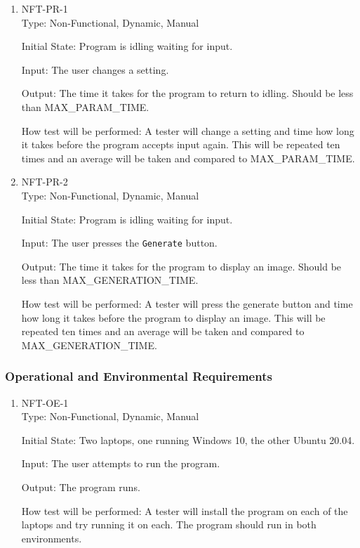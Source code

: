 \documentclass[12pt, titlepage]{article}
\begin{document}
\begin{enumerate}

\item{NFT-PR-1}\\
Type: Non-Functional, Dynamic, Manual

Initial State: Program is idling waiting for input.

Input: The user changes a setting.

Output: The time it takes for the program to return to idling. Should be less than MAX\_PARAM\_TIME.

How test will be performed: A tester will change a setting and time how long it takes before the program accepts input again. This will be repeated ten times and an average will be taken and compared to MAX\_PARAM\_TIME.

\item{NFT-PR-2}\\
Type: Non-Functional, Dynamic, Manual

Initial State: Program is idling waiting for input.

Input: The user presses the \texttt{Generate} button.

Output: The time it takes for the program to display an image. Should be less than MAX\_GENERATION\_TIME.

How test will be performed: A tester will press the generate button and time how long it takes before the program to display an image. This will be repeated ten times and an average will be taken and compared to MAX\_GENERATION\_TIME.

\end{enumerate}

\subsubsection{Operational and Environmental Requirements}

\begin{enumerate}

\item{NFT-OE-1}\\
Type: Non-Functional, Dynamic, Manual

Initial State: Two laptops, one running Windows 10, the other Ubuntu 20.04.

Input: The user attempts to run the program.

Output: The program runs.

How test will be performed: A tester will install the program on each of the laptops and try running it on each. The program should run in both environments.

\end{enumerate}
\end{document}
